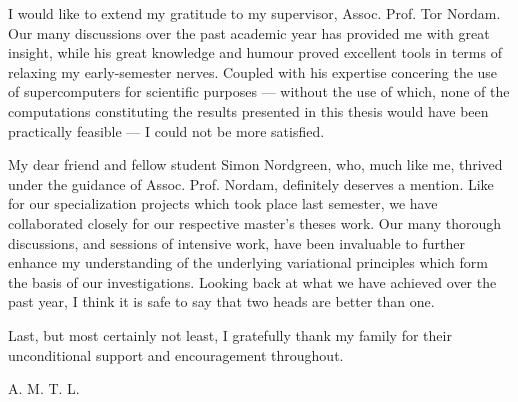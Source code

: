 I would like to extend my gratitude to my supervisor, Assoc. Prof. Tor Nordam.
Our many discussions over the past academic year has provided me with great
insight, while his great knowledge and humour proved excellent tools in terms
of relaxing my early-semester nerves. Coupled with his expertise concering the
use of supercomputers for scientific purposes --- without the use of which,
none of the computations constituting the results presented in this thesis
would have been practically feasible --- I could not be more satisfied.

My dear friend and fellow student Simon Nordgreen, who, much like me, thrived
under the guidance of Assoc. Prof. Nordam, definitely deserves a mention. Like
for our specialization projects which took place last semester, we have
collaborated closely for our respective master's theses work. Our many thorough
discussions, and sessions of intensive work, have been invaluable to further
enhance my understanding of the underlying variational principles which form
the basis of our investigations. Looking back at what we have achieved over the
past year, I think it is safe to say that two heads are better than one.


Last, but most certainly not least, I gratefully thank my family for their
unconditional support and encouragement throughout.

\begin{minipage}[t]{\textwidth}
\begin{flushright}
A. M. T. L.
\end{flushright}
\end{minipage}
